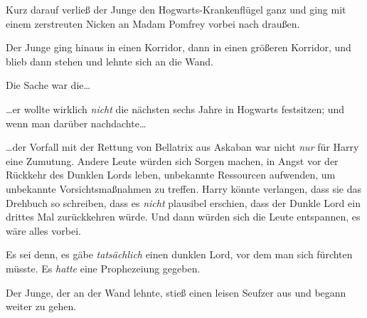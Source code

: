 Kurz darauf verließ der Junge den Hogwarts-Krankenflügel ganz und ging mit einem zerstreuten Nicken an Madam Pomfrey vorbei nach draußen.

Der Junge ging hinaus in einen Korridor, dann in einen größeren Korridor, und blieb dann stehen und lehnte sich an die Wand.

Die Sache war die…

…er wollte wirklich \emph{nicht} die nächsten sechs Jahre in Hogwarts festsitzen; und wenn man darüber nachdachte…

…der Vorfall mit der Rettung von Bellatrix aus Askaban war nicht \emph{nur} für Harry eine Zumutung. Andere Leute würden sich Sorgen machen, in Angst vor der Rückkehr des Dunklen Lords leben, unbekannte Ressourcen aufwenden, um unbekannte Vorsichtsmaßnahmen zu treffen. Harry könnte verlangen, dass sie das Drehbuch so schreiben, dass es \emph{nicht} plausibel erschien, dass der Dunkle Lord ein drittes Mal zurückkehren würde. Und dann würden sich die Leute entspannen, es wäre alles vorbei.

Es sei denn, es gäbe \emph{tatsächlich} einen dunklen Lord, vor dem man sich fürchten müsste. Es \emph{hatte} eine Prophezeiung gegeben.

Der Junge, der an der Wand lehnte, stieß einen leisen Seufzer aus und begann weiter zu gehen.

